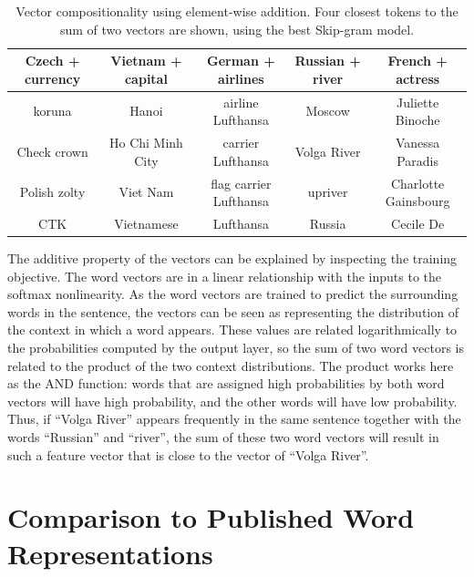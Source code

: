 \documentclass{article}
\begin{document}
\begin{table}
\small
  \begin{center}
  \begin{tabular}{|c|c|c|c|c|}
    \hline
    Czech + currency  & Vietnam + capital & German + airlines      &       Russian + river   &  French + actress             \\
    \hline
    koruna            & Hanoi             & airline Lufthansa      &       Moscow            &  Juliette Binoche     \\
    Check crown       & Ho Chi Minh City  & carrier Lufthansa      &       Volga River       &  Vanessa Paradis      \\
    Polish zolty      & Viet Nam          & flag carrier Lufthansa &       upriver           &  Charlotte Gainsbourg \\
    CTK               & Vietnamese        & Lufthansa              &       Russia            &  Cecile De                    \\
    \hline
  \end{tabular}
  \end{center}
\caption{\label{table:composition} Vector compositionality using element-wise addition. Four closest tokens to the sum
of two vectors are shown, using the best Skip-gram model.}
\end{table}

The additive property of the vectors can be explained by inspecting the
training objective.
The word vectors are in a linear relationship with the inputs
to the softmax nonlinearity.
As the word vectors are trained
to predict the surrounding words in the sentence, the vectors
can be seen as representing the distribution of the context in which a word
appears.  These values are related logarithmically to the probabilities
computed by the output layer, so the sum of two word vectors is related to
the product of the two context distributions. 
The product works here as the AND function: words that are
assigned high probabilities by both word vectors will have high probability, and
the other words will have low probability.
Thus, if ``Volga River'' appears frequently in the same sentence together
with the words ``Russian'' and ``river'', the sum of these two word vectors
will result in such a feature vector that is close to the vector of ``Volga River''.


\section{Comparison to Published Word Representations}
\end{document}

